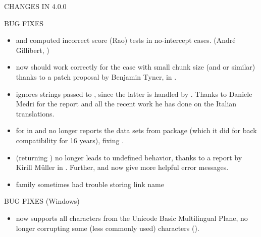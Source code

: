 \documentclass[letterpaper]{book}
\begin{document}
\begin{Section}{ CHANGES IN 4.0.0}
\begin{SubSection}{BUG FIXES}
\begin{itemize}
\item{}  and  computed
incorrect score (Rao) tests in no-intercept cases. (André
Gillibert, )

\item{}  now should work correctly for the
 case with small chunk size (and
 or similar) thanks to a patch proposal by Benjamin
Tyner, in .

\item{}  ignores strings passed to
, since the latter is handled by
. Thanks to Daniele Medri for the report and all
the recent work he has done on the Italian translations.

\item{}  for  in  and
 no longer reports the data sets from package
 (which it did for back compatibility for 16 years),
fixing .

\item{}  (returning ) no longer leads to
undefined behavior, thanks to a report by Kirill Müller in
.  Further,  and  now give
more helpful error messages.

\item{}  family sometimes had trouble storing
link name 

\end{itemize}


\end{SubSection}


%
\begin{SubSection}{BUG FIXES (Windows)}
\begin{itemize}

\item{}  now supports all characters
from the Unicode Basic Multilingual Plane, no longer corrupting
some (less commonly used) characters ().


\end{itemize}
\end{SubSection}
\end{Section}
\end{document}
